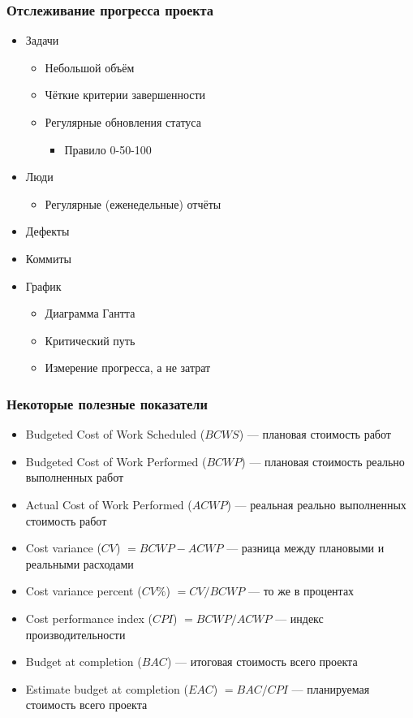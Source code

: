 \documentclass{../../slides-style}
\begin{document}
    \begin{frame}
        \frametitle{Отслеживание прогресса проекта}
        \begin{itemize}
            \item Задачи
            \begin{itemize}
                \item Небольшой объём
                \item Чёткие критерии завершенности
                \item Регулярные обновления статуса
                \begin{itemize}
                    \item Правило 0-50-100
                \end{itemize}
            \end{itemize}
            \item Люди
            \begin{itemize}
                \item Регулярные (еженедельные) отчёты 
            \end{itemize}
            \item Дефекты
            \item Коммиты
            \item График
            \begin{itemize}
                \item Диаграмма Гантта
                \item Критический путь
                \item Измерение прогресса, а не затрат
            \end{itemize}
        \end{itemize}
    \end{frame}

    \begin{frame}
        \frametitle{Некоторые полезные показатели}
        \begin{itemize}
            \item Budgeted Cost of Work Scheduled ($BCWS$) --- плановая стоимость работ
            \item Budgeted Cost of Work Performed ($BCWP$) --- плановая стоимость реально выполненных работ
            \item Actual Cost of Work Performed ($ACWP$) --- реальная реально выполненных стоимость работ
            \item Cost variance ($CV$) $= BCWP - ACWP$ --- разница между плановыми и реальными расходами
            \item Cost variance percent ($CV\%$) $= CV / BCWP$ --- то же в процентах
            \item Cost performance index ($CPI$) $= BCWP / ACWP$ --- индекс производительности
            \item Budget at completion ($BAC$) --- итоговая стоимость всего проекта
            \item Estimate budget at completion ($EAC$) $= BAC / CPI$ --- планируемая стоимость всего проекта
        \end{itemize}
    \end{frame}
\end{document}
